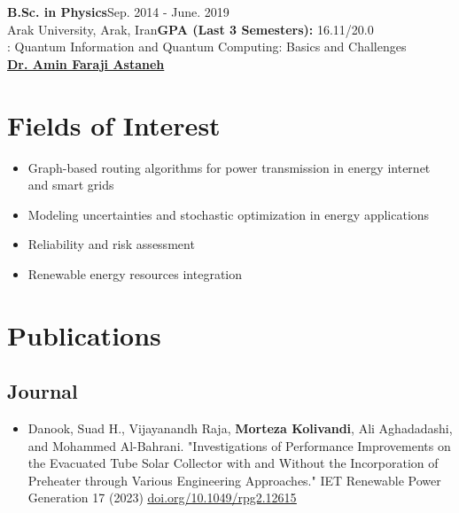 \documentclass[letter,20pt]{article}
\begin{document}
{\fontsize{10}{12}\selectfont %
\textbf{B.Sc. in Physics}\hfill {\footnotesize Sep. 2014 - June. 2019}\\\vspace{5pt}
\hspace{10pt}Arak University, Arak, Iran\hfill \hspace{10pt}\footnotesize \textbf{GPA (Last 3 Semesters):} 16.11/20.0\vspace{3pt}\\
\hspace{10pt} : Quantum Information and Quantum Computing: Basics and Challenges\\
\hspace{10pt} \hyperref[ref:prof3]{\textbf{Dr. Amin Faraji Astaneh}}\\
}

\section{Fields of Interest}	    
\vspace{5pt}

\begin{itemize}[noitemsep, topsep=3pt, leftmargin=3ex]
	\small \item Graph-based routing algorithms for power transmission in energy internet and smart grids \vspace{5pt}
    \small \item Modeling uncertainties and stochastic optimization in energy applications \vspace{5pt}	
	\small \item Reliability and risk assessment \vspace{5pt} 
   \small \item Renewable energy resources integration
    
\end{itemize}


\section{Publications}
\vspace{5pt}
\subsection*{Journal}
     \begin{itemize}[noitemsep, topsep=3pt, leftmargin=3ex]
    \small \item   Danook, Suad H., Vijayanandh Raja, \textbf{Morteza Kolivandi}, Ali Aghadadashi, and Mohammed Al-Bahrani. "Investigations of Performance Improvements on the Evacuated Tube Solar Collector with and Without the Incorporation of Preheater through Various Engineering Approaches." IET Renewable Power Generation 17 (2023)  \href{https://doi.org/10.1049/rpg2.12615}{\underline{doi.org/10.1049/rpg2.12615}}\vspace{5pt}
\end{itemize}
\end{document}
